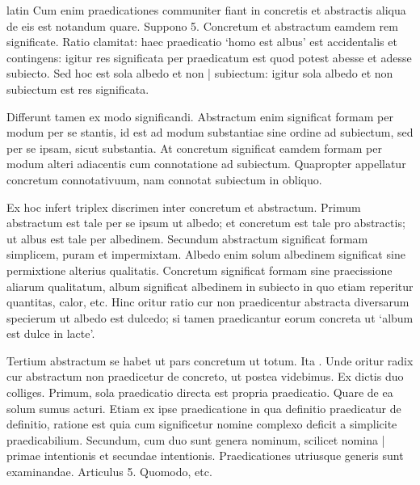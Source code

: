 \begin{otherlanguage*}{latin}
\pstart
  Cum enim praedicationes communiter fiant in concretis et abstractis aliqua de eis est notandum quare. Suppono 5. Concretum et abstractum eamdem rem significate. Ratio clamitat: haec praedicatio `homo est albus' est accidentalis et contingens: igitur res significata per praedicatum est quod potest abesse et adesse subiecto. Sed hoc est sola albedo et non \textnormal{|} subiectum: igitur sola albedo et non subiectum est res significata. 
\pend

\pstart
  Differunt tamen ex modo significandi. Abstractum enim significat formam per modum per se stantis, id est ad modum substantiae sine ordine ad subiectum, sed per se ipsam, sicut substantia. At concretum significat eamdem formam per modum alteri adiacentis cum connotatione ad subiectum. Quapropter appellatur concretum connotativuum, nam connotat subiectum in obliquo. 
\pend

\pstart
  Ex hoc infert  triplex discrimen inter concretum et abstractum. Primum abstractum est tale per se ipsum ut albedo; et concretum est tale pro abstractis; ut albus est tale per albedinem. Secundum abstractum significat formam simplicem, puram et impermixtam. Albedo enim solum albedinem significat sine permixtione alterius qualitatis. Concretum significat formam sine praecissione aliarum qualitatum, album significat albedinem in subiecto in quo etiam reperitur quantitas, calor, etc. Hinc oritur ratio cur non praedicentur abstracta diversarum specierum ut albedo est dulcedo; si tamen praedicantur eorum concreta ut `album est dulce in lacte'. 
\pend

\pstart
  Tertium abstractum se habet ut pars concretum ut totum. Ita . Unde oritur radix cur abstractum non praedicetur de concreto, ut postea videbimus. Ex dictis duo colliges. Primum, sola praedicatio directa est propria praedicatio. Quare de ea solum sumus acturi. Etiam ex ipse praedicatione in qua definitio praedicatur de definitio, ratione est quia cum significetur nomine complexo deficit a simplicite praedicabilium. Secundum, cum duo sunt genera nominum, scilicet nomina \textnormal{|}   primae intentionis et secundae intentionis. Praedicationes utriusque generis sunt examinandae. Articulus 5. Quomodo, etc. 
\pend

        \pstart
        \pend
      

\end{otherlanguage*}
